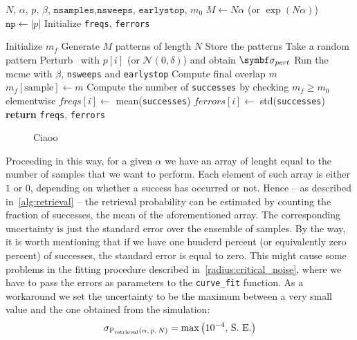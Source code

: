 \documentclass[\rootdir/main.tex]{subfiles}
\begin{document}
\begin{algorithm}
    \caption{Compute  for a range of $p$}
    \label{alg:retrieval}
    \begin{algorithmic}[1]
    \Require $N$, $\alpha$, $p$, $\beta$, $\mathtt{nsamples}$,$\mathtt{nsweeps}$, $\mathtt{earlystop}$, $m_0$
    \State $M \gets N\alpha$ (or $\exp(N\alpha)$)
    \State $\mathtt{np} \gets |p|$
    \State Initialize \texttt{freqs}, \texttt{ferrors} 

        \State Initialize $m_f$ 
            \State Generate $M$ patterns of length $N$
            \State Store the patterns 
            \State Take a random pattern \bxi
            \State Perturb \bxi\ with $p[i]$ (or $\mathcal{N\left(0, \delta\right)}$) and obtain $\bsigma_{pert}$
            \State Run the \acrshort{mcmc} with $\beta$, \texttt{nsweeps} and \texttt{earlystop}
            \State Compute final overlap $m$
            \State $m_f[\text{sample}] \gets m$
        \EndFor
        \State Compute the number of \texttt{successes} by checking $m_f \geq m_0$ elementwise
        \State $freqs[i] \gets$ mean(\texttt{successes})
        \State $ferrors[i] \gets$ std(\texttt{successes})
    \EndFor
    \State \textbf{return} \texttt{freqs}, \texttt{ferrors}
    \end{algorithmic}
\end{algorithm}

\begin{figure}\label{fig:pret_example}
    \centering
    
    \caption{Ciaoo}
\end{figure}

Proceeding in this way, for a given $\alpha$ we have an array of lenght equal to the number of samples that we want to perform. Each element of such array is either $1$ or $0$, depending on whether a success has occurred or not. Hence -- as described in~\cref{alg:retrieval} --  the retrieval probability can be estimated by counting the fraction of successes, \ie the mean of the aforementioned array. The corresponding uncertainty is just the standard error over the ensemble of samples. By the way, it is worth mentioning that if we have one hunderd percent (or equivalently zero percent) of successes, the standard error is equal to zero. This might cause some problems in the fitting procedure described in~\cref{radius:critical_noise}, where we have to pass the errors as parameters to the \texttt{curve\_fit} function. As a workaround we set the uncertainty to be the maximum between a very small value and the one obtained from the simulation:
\begin{equation*}
    \sigma_{ \mathrm{P}_{\text{retrieval}} \left( \alpha, \, p, \, N \right) } = \max\left(10^{-4}, \, \text{S. E.}\right)
\end{equation*}
\end{document}
